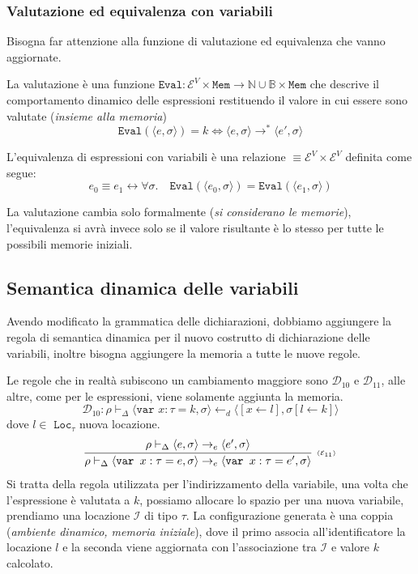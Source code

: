 \documentclass[oneside,a4paper,11pt]{book}
\theoremstyle{italicstyle}
\theoremstyle{normStyle}
\begin{document}
\subsubsection{Valutazione ed equivalenza con variabili}
Bisogna far attenzione alla funzione di valutazione ed equivalenza che vanno aggiornate.
\begin{tcolorbox}[title ={Valutazione delle espressioni con variabili}]
La valutazione è una funzione $\texttt{Eval}:\mathcal{E}^V \times \texttt{Mem}
\rightarrow \mathbb{N}\cup\mathbb{B}\times\texttt{Mem}$ che descrive il 
comportamento dinamico delle espressioni restituendo il valore in cui essere 
sono valutate (\textit{insieme alla memoria})
\[
  \texttt{Eval}(\langle e,\sigma\rangle)= k \Longleftrightarrow \langle e,\sigma\rangle \rightarrow^* \langle e',\sigma\rangle
\]
\end{tcolorbox}
\begin{tcolorbox}[title = {Equivalenza di espressioni con variabili}]
  L'equivalenza di espressioni con variabili è una relazione 
  $\equiv \mathcal{E}^V \times \mathcal{E}^V$ definita come segue:
  \[
    e_0 \equiv e_1 \longleftrightarrow \forall\sigma.\quad\texttt{Eval}(\langle e_0,\sigma\rangle)
    = \texttt{Eval}(\langle e_1,\sigma\rangle)
  \]
\end{tcolorbox}
La valutazione cambia solo formalmente (\textit{si considerano le memorie}),
l'equivalenza si avrà invece solo se il valore risultante è lo stesso per tutte le possibili memorie 
iniziali.
\subsection{Semantica dinamica delle variabili}
Avendo modificato la grammatica delle dichiarazioni, dobbiamo aggiungere la regola di semantica 
dinamica per il nuovo costrutto di dichiarazione delle variabili, inoltre 
bisogna aggiungere la memoria a tutte le nuove regole.

Le regole che in realtà subiscono un cambiamento maggiore sono $\mathcal{D}_{10}$ e 
$\mathcal{D}_{11}$, alle altre, come per le espressioni, viene solamente aggiunta 
la memoria.
\[
  \mathcal{D}_{10}: \rho \vdash_\Delta \langle \texttt{var }x:\tau=k,\sigma\rangle
  \leftarrow_d 
  \langle[x \leftarrow l], \sigma[l \leftarrow k] \rangle 
\]
dove $l\in \texttt{ Loc}_\tau$ nuova locazione. 
\[
    \infer[\scriptscriptstyle (\mathcal{E}_{11})]
    {
      \rho \vdash_\Delta \langle \texttt{var }x:\tau=e,\sigma\rangle \rightarrow_e \langle \texttt{var }x:\tau=e',\sigma\rangle
    }
    {
      \rho \vdash_\Delta \langle e , \sigma \rangle \rightarrow_e \langle e', \sigma \rangle
    }
\]
Si tratta della regola utilizzata per l'indirizzamento della variabile, una volta che l'espressione 
è valutata a $k$, possiamo allocare lo spazio per una nuova variabile, prendiamo una locazione 
$\mathcal{I}$ di tipo $\tau$. La configurazione generata è una coppia 
(\textit{ambiente dinamico, memoria iniziale}), dove il primo associa all'identificatore 
la locazione $l$ e la seconda viene aggiornata con l'associazione tra 
$\mathcal{I}$ e valore $k$ calcolato.
\end{document}
